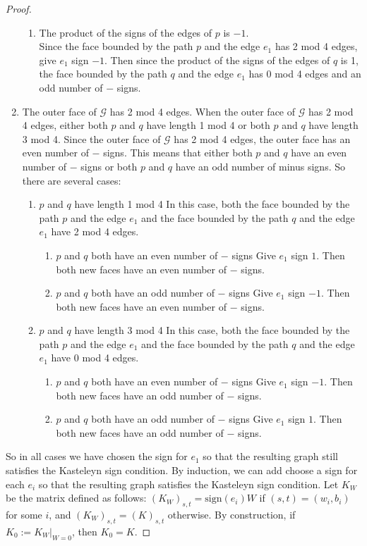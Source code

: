 \documentclass[11pt]{amsart}
\theoremstyle{definition}
\begin{document}
\begin{proof}
\begin{enumerate}
\begin{enumerate}
\item The product of the signs of the edges of $p$ is $-1$.\\
Since the face bounded by the path $p$ and the edge $e_1$ has 2 mod 4 edges, give $e_1$ sign $-1$. Then since the product of the signs of the edges of $q$ is 1, the face bounded by the path $q$ and the edge $e_1$ has 0 mod 4 edges and an odd number of $-$ signs. 
\end{enumerate}
\item The outer face of $\mathcal{G}$ has 2 mod 4 edges. 
When the outer face of $\mathcal{G}$ has 2 mod 4 edges, either both $p$ and $q$ have length 1 mod 4 or both $p$ and $q$ have length 3 mod 4. 
Since the outer face of $\mathcal{G}$ has 2 mod 4 edges, the outer face has an even number of $-$ signs. This means that either both $p$ and $q$ have an even number of $-$ signs or both $p$ and $q$ have an odd number of minus signs. So there are several cases: 
\begin{enumerate}
\item $p$ and $q$ have length 1 mod 4
In this case, both the face bounded by the path $p$ and the edge $e_1$ and the face bounded by the path $q$ and the edge $e_1$ have 2 mod 4 edges. 
\begin{enumerate}
\item $p$ and $q$ both have an even number of $-$ signs
Give $e_1$ sign $1$. Then both new faces have an even number of $-$ signs. 
\item $p$ and $q$ both have an odd number of $-$ signs
Give $e_1$ sign $-1$. Then both new faces have an even number of $-$ signs. 
\end{enumerate}
\item $p$ and $q$ have length 3 mod 4
In this case, both the face bounded by the path $p$ and the edge $e_1$ and the face bounded by the path $q$ and the edge $e_1$ have 0 mod 4 edges. 
\begin{enumerate}
\item $p$ and $q$ both have an even number of $-$ signs
Give $e_1$ sign $-1$. Then both new faces have an odd number of $-$ signs. 
\item $p$ and $q$ both have an odd number of $-$ signs
Give $e_1$ sign $1$. Then both new faces have an odd number of $-$ signs. 
\end{enumerate}
\end{enumerate}
\end{enumerate}
So in all cases we have chosen the sign for $e_1$ so that the resulting graph still satisfies the Kasteleyn sign condition. By induction, we can add choose a sign for each $e_i$ so that the resulting graph satisfies the Kasteleyn sign condition. Let $K_{W}$ be the matrix defined as follows: $(K_{W})_{s, t} = \text{sign}(e_i) W$ if $(s, t) = (w_{i}, b_{i})$ for some $i$, and $(K_{W})_{s, t} = (K)_{s, t}$ otherwise. By construction, if $K_{0} := K_{W} |_{W = 0}$, then $K_0 = K$. 

\end{proof}
\end{document}
